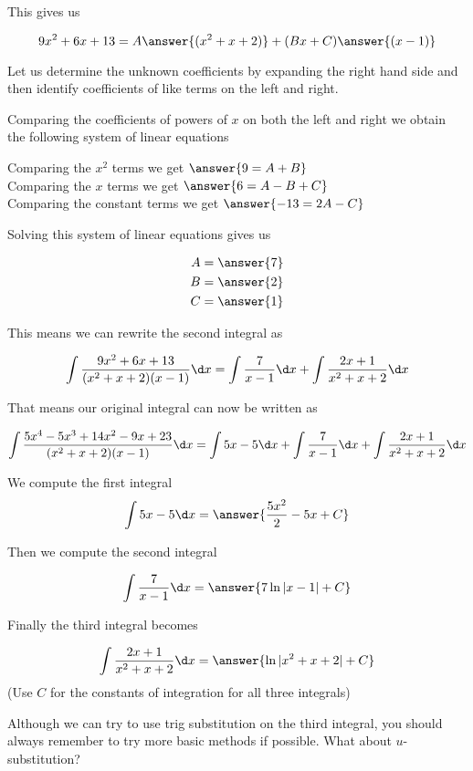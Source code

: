 \documentclass{ximera}
\begin{document}
\begin{exercise}
\begin{exercise}
\begin{exercise}
This gives us 

\[
9x^{2}+6x+13=A\answer{(x^{2}+x+2)} + (Bx+C)\answer{(x-1)}
\]

Let us determine the unknown coefficients by expanding the right hand side and then identify coefficients of like terms on the left and right.



Comparing the coefficients of powers of $x$ on both the left and right we obtain the following system of linear equations


Comparing the $x^{2}$ terms we get $\answer {9=A+B}$ \\
Comparing the $x$ terms we get $\answer{6=A-B+C}$ \\
Comparing the constant terms we get $\answer{-13=2A-C}$ 

\begin{exercise}
Solving this system of linear equations gives us

\begin{align}
A&=\answer{  7 }\\
B&=\answer{2  }\\
C&=\answer{  1 }
\end{align}





\begin{exercise}
This means we can  rewrite the second integral as

\[
\int \frac{9x^{2}+6x+13}{(x^{2}+x+2)(x-1)} \d x= \int \frac{7}{x-1} \d x + \int \frac{2x+1}{x^{2}+x+2} \d x
\]

 That means our original integral can now be written as 

\[
\int \frac{5x^{4}-5x^{3}+14x^{2}-9x+23}{(x^{2}+x+2)(x-1)} \d x= \int 5x-5 \d x + \int \frac{7}{x-1} \d x +
\int \frac{2x+1}{x^{2}+x+2} \d x 
\]

We compute the first integral 
\[
\int 5x-5 \d x =\answer{ \frac{5x^{2}}{2} - 5x +C }
\]

Then we compute the second integral 

\[
\int \frac{7}{x-1} \d x= \answer{ 7\ln|x-1|+C }
\]

Finally the third integral becomes 

\[
\int \frac{2x+1}{x^{2}+x+2} \d x=\answer{ \ln| x^{2}+x+2 | + C}
\]
(Use $C$ for the constants of integration for all three integrals)

\begin{hint}
Although we can try to use trig substitution on the third integral, you should always remember to try more basic
methods if possible. What about $u$-substitution?
\end{hint}






\end{exercise}
\end{exercise}
\end{exercise}
\end{exercise}
\end{exercise}
\end{document}

